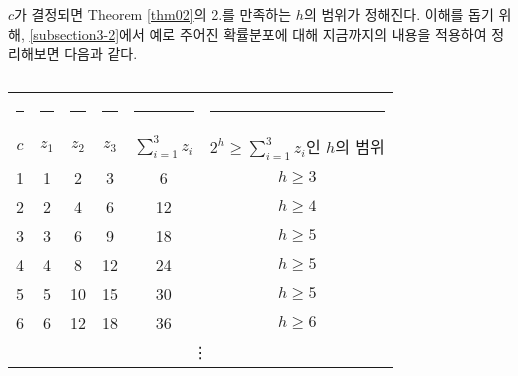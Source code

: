\documentclass[11pt]{article}
\begin{document}
$c$가 결정되면 Theorem \ref{thm02}의 2.를 만족하는 $h$의 범위가 정해진다. 이해를 돕기 위해, \ref{subsection3-2}에서 예로 주어진 확률분포에 대해 지금까지의 내용을 적용하여 정리해보면 다음과 같다.
\\
\begin{table}[h]
\centering
\begin{tabular}{cccccc}
\toprule
\rule{1cm}{0pt} & \rule{0.6cm}{0pt} & \rule{0.6cm}{0pt} & \rule{0.6cm}{0pt} & \rule{1.2cm}{0pt} & \rule{3cm}{0pt} \\[-\arraystretch\normalbaselineskip]
$c$ & $z_{1}$ & $z_{2}$ & $z_{3}$ & $\displaystyle \sum_{i=1}^{3}z_{i}$ & $2^{h} \ge \displaystyle \sum_{i=1}^{3}z_{i}$인 $h$의 범위 \\
\midrule
1 & 1 & 2 & 3 & 6 & $h \ge 3$\\
2 & 2 & 4 & 6 & 12 & $h \ge 4$\\
3 & 3 & 6 & 9 & 18 & $h \ge 5$\\
4 & 4 & 8 & 12 & 24 & $h \ge 5$\\
5 & 5 & 10 & 15 & 30 & $h \ge 5$\\
6 & 6 & 12 & 18 & 36 & $h \ge 6$\\
\multicolumn{6}{c}{\vdots}\\
\bottomrule
\end{tabular}
\caption{}
\label{tab05}
\end{table}
\end{document}
